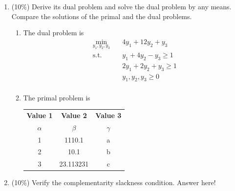 \documentclass[a4paper,10pt]{article}
\begin{document}
\begin{enumerate}
\begin{enumerate}
        \item (10\%) Derive its dual problem and solve the dual problem by any means. Compare the solutions of the primal and the dual problems.
        {\color{blue} 
            \begin{enumerate}
            \item The dual problem is
                \begin{equation}
                    \begin{aligned}
                        \min_{y_1, y_2, y_3} \quad & 4y_1 + 12y_2 + y_3 \\
                        \textrm{s.t.} \quad & y_1 + 4y_2 - y_3 \geq 1 \\
                            \quad & 2y_1 + 2y_2 + y_3 \geq 1 \\
                            \quad & y_1, y_2, y_3 \geq 0 \\
                    \end{aligned}
                \end{equation}
            \item The primal problem is
                \begin{center}
                    \begin{tabular}{ c | c | c } %
                        \textbf{Value 1} & \textbf{Value 2} & \textbf{Value 3}\\
                        $\alpha$ & $\beta$ & $\gamma$ \\
                        \hline
                        1 & 1110.1 & a\\
                        2 & 10.1 & b\\
                        3 & 23.113231 & c\\
                    \end{tabular}
                \end{center}
            
            \end{enumerate}
        }

        \item (10\%) Verify the complementarity slackness condition.
        {\color{blue}
            Answer here!
        }


\end{enumerate}
\end{enumerate}
\end{document}
